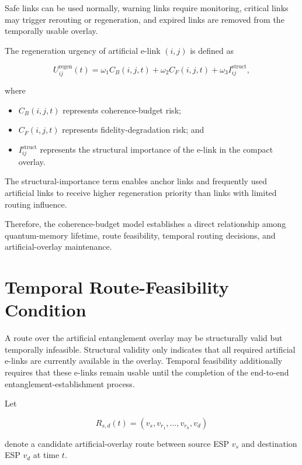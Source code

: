 Safe links can be used normally, warning links require monitoring, critical links may trigger rerouting or regeneration, and expired links are removed from the temporally usable overlay.

The regeneration urgency of artificial e-link $(i,j)$ is defined as

\begin{equation}
    U_{ij}^{\mathrm{regen}}(t)
    =
    \omega_1 C_B(i,j,t)
    +
    \omega_2 C_F(i,j,t)
    +
    \omega_3 I_{ij}^{\mathrm{struct}},
\end{equation}

where

\begin{itemize}
    \item $C_B(i,j,t)$ represents coherence-budget risk;
    \item $C_F(i,j,t)$ represents fidelity-degradation risk; and
    \item $I_{ij}^{\mathrm{struct}}$ represents the structural importance of the e-link in the compact overlay.
\end{itemize}

The structural-importance term enables anchor links and frequently used artificial links to receive higher regeneration priority than links with limited routing influence.

Therefore, the coherence-budget model establishes a direct relationship among quantum-memory lifetime, route feasibility, temporal routing decisions, and artificial-overlay maintenance.
\section{Temporal Route-Feasibility Condition}

A route over the artificial entanglement overlay may be structurally valid but temporally infeasible. Structural validity only indicates that all required artificial e-links are currently available in the overlay. Temporal feasibility additionally requires that these e-links remain usable until the completion of the end-to-end entanglement-establishment process.

Let

\begin{equation}
    R_{s,d}(t)
    =
    \left(
    v_s,
    v_{r_1},
    \ldots,
    v_{r_h},
    v_d
    \right)
\end{equation}

denote a candidate artificial-overlay route between source ESP $v_s$ and destination ESP $v_d$ at time $t$.


